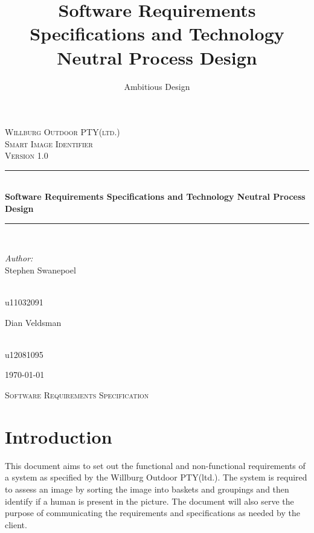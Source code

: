 \documentclass[a4paper,12pt]{report}
\author{Ambitious Design}
\title{ Software Requirements Specifications and Technology Neutral Process Design}
\newcommand{\HRule}{\rule{\linewidth}{0.5mm}}
\begin{document}
\setlength{\parskip}{6pt}

\begin{titlepage}

\begin{center}
\textsc{\LARGE Willburg Outdoor PTY(ltd.)}\\[1.5cm]
\textsc{\Large Smart Image Identifier }\\[1.0cm]
\textsc{\Large Version 1.0 }\\[0.5cm]
\HRule \\[0.4cm]
{ \huge \bfseries  Software Requirements Specifications and Technology Neutral Process Design}\\[0.4cm]
\HRule \\[0.4cm]
\begin{minipage}{0.4\textwidth}
\begin{flushleft} \large
\emph{Author:}\\
Stephen {Swanepoel}
\end{flushleft}
\end{minipage}
\begin{minipage}{0.4\textwidth}
\begin{flushright} \large
\emph{} \\
u11032091
\end{flushright}
\end{minipage}
\begin{minipage}{0.4\textwidth}
\begin{flushleft} \large
Dian {Veldsman}
\end{flushleft}
\end{minipage}
\begin{minipage}{0.4\textwidth}
\begin{flushright} \large
\emph{} \\
u12081095
\end{flushright}
\end{minipage}

{\large \today}
\end{center}
\end{titlepage}
\footnotesize
\normalsize

\renewcommand{\thesection}{\arabic{section}}
\newpage
\begin{center}
\textsc{\LARGE Software Requirements Specification}\\[1.5cm]
\end{center}

\section{Introduction}
This document aims to set out the functional and non-functional requirements of a system as specified by the Willburg Outdoor PTY(ltd.). The system is required to assess an image by sorting the image into baskets and groupings and then identify if a human is present in the picture. The document will also serve the purpose of communicating the requirements and specifications as needed by the client.
\end{document}
